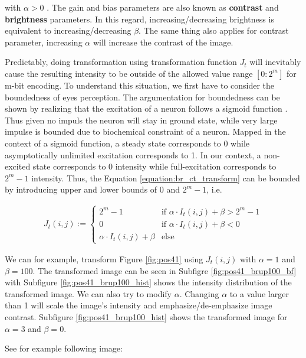 \documentclass[pdftex,12pt,a4paper]{report}
\begin{document}
with $\alpha > 0$ \cite{szeliski2010computer}. The gain and bias parameters are also known as \textbf{contrast} and \textbf{brightness} parameters. In this regard, increasing/decreasing brightness is equivalent to increasing/decreasing $\beta$. The same thing also applies for contrast parameter, increasing $\alpha$ will increase the contrast of the image.

Predictably, doing transformation using transformation function $J_t$ will inevitably cause the resulting intensity to be outside of the allowed value range $[0:2^m]$ for m-bit encoding. To understand this situation, we first have to consider the boundedness of eyes perception. The argumentation for boundedness can be shown by realizing that the excitation of a neuron follows a sigmoid function \cite{gazzaniga2004cognitive}. Thus given no impuls the neuron will stay in ground state, while very large impulse is bounded due to biochemical constraint of a neuron. Mapped in the context of a sigmoid function, a steady state corresponds to 0 while asymptotically unlimited excitation corresponds to 1. In our context, a non-excited state corresponds to 0 intensity while full-excitation corresponds to $2^m - 1$ intensity. Thus, the Equation \ref{equation:br_ct_transform} can be bounded by introducing upper and lower bounds of $0$ and $2^m - 1$, i.e.

\begin{gather*}
J_t(i, j) :=
\begin{cases}
  2^m - 1 & \text{if } \alpha \cdot I_t(i, j) + \beta > 2^m - 1\\
  0 & \text{if } \alpha \cdot I_t(i, j) + \beta < 0\\
  \alpha \cdot I_t(i, j) + \beta & \text{else}
\end{cases}
\end{gather*}

We can for example, transform Figure \ref{fig:pos41} using $J_t(i, j)$ with $\alpha = 1$ and $\beta=100$. The transformed image can be seen in Subfigre \ref{fig:pos41_brup100_bf} with Subfigure \ref{fig:pos41_brup100_hist} shows the intensity distribution of the transformed image. We can also try to modify $\alpha$. Changing $\alpha$ to a value larger than 1 will scale the image's intensity and emphasize/de-emphasize image contrast. Subfigure \ref{fig:pos41_brup100_hist} shows the transformed image for $\alpha = 3$ and $\beta  = 0$.

See for example following image:
\end{document}
